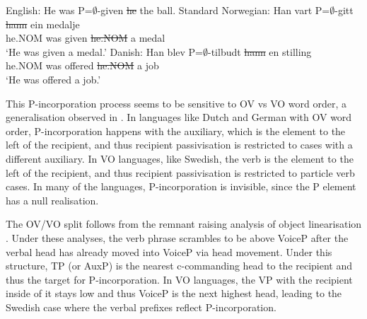 \begin{exe}
	\ex English: He was P=$\emptyset$-given \sout{he} the ball.\label{ex:eng-null-incorp}
	\ex Standard Norwegian:\label{ex:nor-null-incorp}
	\gll Han vart P=$\emptyset$-gitt \sout{hann} ein medalje\\
	he.NOM was given \sout{he.NOM} a medal\\
	\trans `He was given a medal.'
	\ex Danish:\label{ex:dan-null-incorp}
	\gll Han blev P=$\emptyset$-tilbudt \sout{hann} en stilling\\
	he.NOM was offered \sout{he.NOM} a job\\
	\trans `He was offered a job.'
\end{exe}

This P-incorporation process seems to be sensitive to OV vs VO word order, a generalisation observed in \cite{Sprouse.1995}. In languages like Dutch and German with OV word order, P-incorporation happens with the auxiliary, which is the element to the left of the recipient, and thus recipient passivisation is restricted to cases with a different auxiliary. In VO languages, like Swedish, the verb is the element to the left of the recipient, and thus recipient passivisation is restricted to particle verb cases. In many of the languages, P-incorporation is invisible, since the P element has a null realisation.

The OV/VO split follows from the remnant raising analysis of object linearisation \citep{Biberauer.2004,Biberauer.2005,Wallenberg.2009}. Under these analyses, the verb phrase scrambles to be above VoiceP after the verbal head has already moved into VoiceP via head movement. Under this structure, TP (or AuxP) is the nearest c-commanding head to the recipient and thus the target for P-incorporation. In VO languages, the VP with the recipient inside of it stays low and thus VoiceP is the next highest head, leading to the Swedish case where the verbal prefixes reflect P-incorporation.

